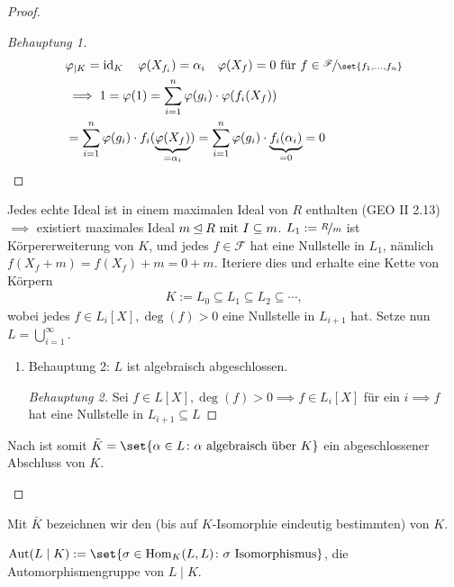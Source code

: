 \begin{proof}
\begin{itemize}
\begin{enumerate}[label=(\alph*)]
\begin{proof}[Behauptung 1]
\begin{align*}
							&\varphi_{\mid K} = \id_K \quad \varphi(X_{f_i}) = \alpha_i \quad \varphi(X_f) = 0 \text{ für } f \in \lnkset{\mathscr{F}}{\set{f_1,\dots, f_n}}\\
							&\implies 1 = \varphi(1) = \sum_{i=1}^n \varphi(g_i) \cdot \varphi(f_i (X_f))\\
							&= \sum_{i=1}^n \varphi(g_i) \cdot f_i (\underbrace{\varphi(X_f)}_{= \alpha_i}) = \sum_{i=1}^n \varphi(g_i) \cdot \underbrace{f_i (\alpha_i)}_{=0} = 0
						\end{align*}
					\end{proof}
				\end{enumerate}
		Jedes echte Ideal ist in einem maximalen Ideal von $R$ enthalten (GEO II 2.13) $\implies$ existiert maximales Ideal $m \unlhd R \mit I \subseteq m$. $L_1 := \lnkset{R}{m}$ ist Körpererweiterung von $K$, und jedes $f \in \mathscr{F}$ hat eine Nullstelle in $L_1$, nämlich $f(X_f + m) = f(X_f) + m = 0 + m$. Iteriere dies und erhalte eine Kette von Körpern
		\begin{align*}
			K := L_0 \subseteq L_1 \subseteq L_2 \subseteq \cdots,
		\end{align*}
		wobei jedes $f \in L_i [X], \deg(f) >0$ eine Nullstelle in $L_{i+1}$ hat. Setze nun $L = \bigcup_{i=1}^{\infty}$.
			\begin{enumerate}[label=(\alph*)]
				\item Behauptung 2: $L$ ist algebraisch abgeschlossen.
				\begin{proof}[Behauptung 2]
					Sei $f \in L[X], \deg(f) > 0 \implies f \in L_i [X]$ für ein $i \implies f$ hat eine Nullstelle in $L_{i+1} \subseteq L$
				\end{proof}
			\end{enumerate}
		Nach  ist somit $\tilde{K} = \set{\alpha \in L \colon \alpha \text{ algebraisch über }K}$ ein abgeschlossener Abschluss von $K$.
	\end{itemize}
\end{proof}
\begin{definition}
	Mit $\bar{K}$ bezeichnen wir den (bis auf $K$-Isomorphie eindeutig bestimmten)  von $K$.
\end{definition}
\begin{definition}[Automorphismengruppe]
	$\Aut(L\mid K) := \set{ \sigma \in \Hom_K (L,L)\colon \sigma \text{ Isomorphismus} }$, die Automorphismengruppe von $L\mid K$.
\end{definition}
